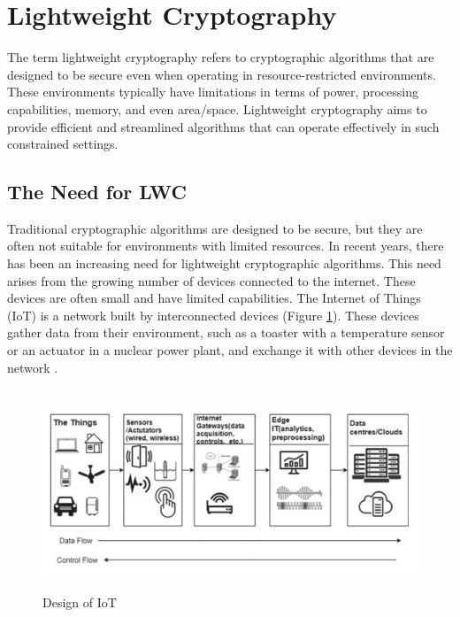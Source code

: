 \section{Lightweight Cryptography}
The term lightweight cryptography refers to cryptographic algorithms that are designed to be secure even when operating in resource-restricted environments. These environments typically have limitations in terms of power, processing capabilities, memory, and even area/space. Lightweight cryptography aims to provide efficient and streamlined algorithms that can operate effectively in such constrained settings.



\subsection{The Need for LWC}   %
Traditional cryptographic algorithms are designed to be secure, but they are often not suitable for environments with limited resources. In recent years, there has been an increasing need for lightweight cryptographic algorithms. This need arises from the growing number of devices connected to the internet. These devices are often small and have limited capabilities.
\newline
The Internet of Things (IoT) is a network built by interconnected devices (Figure \ref{fig:IoT}). These devices gather data from their environment, such as a toaster with a temperature sensor or an actuator in a nuclear power plant, and exchange it with other devices in the network \cite{chauhan2022analysis}.

\begin{figure}[h]
    \centering
    \includegraphics[width=14.0cm, height=6.0cm]{media/DesignofInternetofThings(IoT).png}
    \caption{Design of IoT}
    \label{fig:IoT}
\end{figure}

